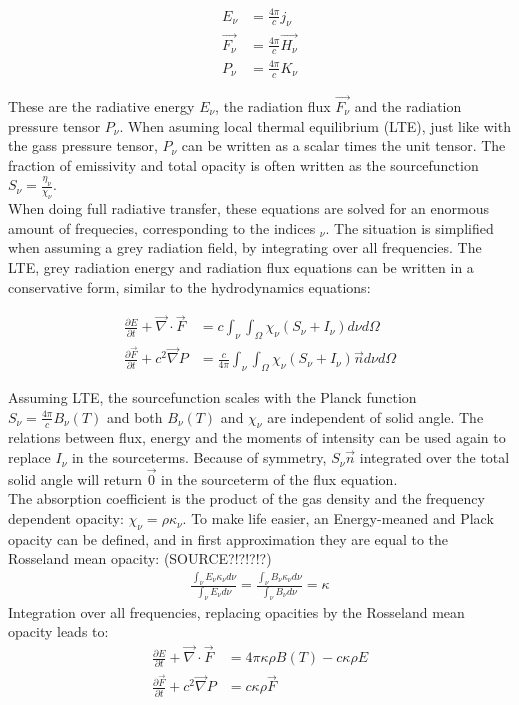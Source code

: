 \begin{align}
E_\nu &= \frac{4 \pi}{c} j_\nu \\
\vec{F_\nu} &= \frac{4 \pi}{c} \vec{H_\nu} \\
P_\nu &= \frac{4 \pi}{c} K_\nu
\end{align}

These are the radiative energy $E_\nu$, the radiation flux $\vec{F_\nu}$ and the radiation pressure tensor $P_\nu$. When asuming local thermal equilibrium (LTE), just like with the gass pressure tensor, $P_\nu$ can be written as a scalar times the unit tensor. The fraction of emissivity and total opacity is often written as the sourcefunction $S_\nu = \frac{\eta_\nu}{\chi_\nu}$. \\
 When doing full radiative transfer, these equations are solved for an enormous amount of frequecies, corresponding to the indices $_\nu$. The situation is simplified when assuming a grey radiation field, by integrating over all frequencies. The LTE, grey radiation energy and radiation flux equations can be written in a conservative form, similar to the hydrodynamics equations:

\begin{align}
\frac{\partial E}{\partial t} + \vec{\nabla} \cdot \vec{F} &= c \int_\nu \int_\Omega \chi_\nu \left( S_\nu + I_\nu \right) d\nu d\Omega \\
\frac{\partial \vec{F}}{\partial t} + c^2 \vec{\nabla} P &= \frac{c}{4 \pi} \int_\nu \int_\Omega \chi_\nu \left( S_\nu + I_\nu \right) \vec{n} d\nu d\Omega
\end{align}

Assuming LTE, the sourcefunction scales with the Planck function $S_\nu = \frac{4\pi}{c} B_\nu(T)$ and both $B_\nu(T)$ and $\chi_\nu$ are independent of solid angle. The relations between flux, energy and the moments of intensity can be used again to replace $I_\nu$ in the sourceterms. Because of symmetry, $S_\nu \vec{n}$ integrated over the total solid angle will return $\vec{0}$ in the sourceterm of the flux equation.\\
The absorption coefficient is the product of the gas density and the frequency dependent opacity: $\chi_\nu = \rho \kappa_\nu$. To make life easier, an Energy-meaned and Plack opacity can be defined, and in first approximation they are equal to the Rosseland mean opacity: (SOURCE?!?!?!?)
\begin{align}
\frac{\int_\nu E_\nu \kappa_\nu d\nu}{\int_\nu E_\nu d\nu} = \frac{\int_\nu B_\nu \kappa_\nu d\nu}{\int_\nu B_\nu d\nu} = \kappa
\end{align}
Integration over all frequencies, replacing opacities by the Rosseland mean opacity leads to:
\begin{align}
\frac{\partial E}{\partial t} + \vec{\nabla} \cdot \vec{F} &= 4\pi \kappa\rho B(T) - c \kappa \rho E\\
\frac{\partial \vec{F}}{\partial t} + c^2 \vec{\nabla} P &=  c \kappa \rho \vec{F} 
\end{align}

